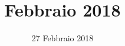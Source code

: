 


\title{ Febbraio 2018}
\author{\GroupName}

\date{27 Febbraio 2018}



\frenchspacing

\makeFrontPage



